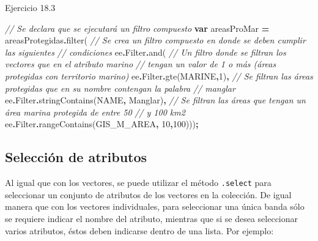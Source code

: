 \documentclass[
  12pt,
  letterpaper,
  twoside]{book}
\newenvironment{Shaded}{\begin{snugshade}}{\end{snugshade}}
\newcommand{\AttributeTok}[1]{\textcolor[rgb]{0.77,0.63,0.00}{#1}}
\newcommand{\CommentTok}[1]{\textcolor[rgb]{0.56,0.35,0.01}{\textit{#1}}}
\newcommand{\DecValTok}[1]{\textcolor[rgb]{0.00,0.00,0.81}{#1}}
\newcommand{\FunctionTok}[1]{\textcolor[rgb]{0.00,0.00,0.00}{#1}}
\newcommand{\KeywordTok}[1]{\textcolor[rgb]{0.13,0.29,0.53}{\textbf{#1}}}
\newcommand{\NormalTok}[1]{#1}
\newcommand{\OperatorTok}[1]{\textcolor[rgb]{0.81,0.36,0.00}{\textbf{#1}}}
\newcommand{\StringTok}[1]{\textcolor[rgb]{0.31,0.60,0.02}{#1}}
\begin{document}
Ejercicio 18.3

\begin{Shaded}
\begin{Highlighting}[]
\CommentTok{// Se declara que se ejecutará un filtro compuesto}
\KeywordTok{var}\NormalTok{ areasProMar }\OperatorTok{=}\NormalTok{ areasProtegidas}\OperatorTok{.}\FunctionTok{filter}\NormalTok{( }
  \CommentTok{// Se crea un filtro compuesto en donde se deben cumplir las siguientes }
  \CommentTok{// condiciones}
\NormalTok{  ee}\OperatorTok{.}\AttributeTok{Filter}\OperatorTok{.}\FunctionTok{and}\NormalTok{(    }
  \CommentTok{// Un filtro donde se filtran los vectores que en el atributo marino }
  \CommentTok{// tengan un valor de 1 o más (áreas protegidas con territorio marino)}
\NormalTok{  ee}\OperatorTok{.}\AttributeTok{Filter}\OperatorTok{.}\FunctionTok{gte}\NormalTok{(}\StringTok{\textquotesingle{}MARINE\textquotesingle{}}\OperatorTok{,}\DecValTok{1}\NormalTok{)}\OperatorTok{,}   
  \CommentTok{// Se filtran las áreas protegidas que en su nombre contengan la palabra}
  \CommentTok{// manglar}
\NormalTok{  ee}\OperatorTok{.}\AttributeTok{Filter}\OperatorTok{.}\FunctionTok{stringContains}\NormalTok{(}\StringTok{\textquotesingle{}NAME\textquotesingle{}}\OperatorTok{,} \StringTok{\textquotesingle{}Manglar\textquotesingle{}}\NormalTok{)}\OperatorTok{,}
  \CommentTok{// Se filtran las áreas que tengan un área marina protegida de entre 50 }
  \CommentTok{// y 100 km2}
\NormalTok{  ee}\OperatorTok{.}\AttributeTok{Filter}\OperatorTok{.}\FunctionTok{rangeContains}\NormalTok{(}\StringTok{\textquotesingle{}GIS\_M\_AREA\textquotesingle{}}\OperatorTok{,} \DecValTok{10}\OperatorTok{,}\DecValTok{100}\NormalTok{)))}\OperatorTok{;} 
\end{Highlighting}
\end{Shaded}

\hypertarget{selecciuxf3n-de-atributos}{%
\subsection{Selección de atributos}\label{selecciuxf3n-de-atributos}}

Al igual que con los vectores, se puede utilizar el método \texttt{.select} para seleccionar un conjunto de atributos de los vectores en la colección. De igual manera que con los vectores individuales, para seleccionar una única banda sólo se requiere indicar el nombre del atributo, mientras que si se desea seleccionar varios atributos, éstos deben indicarse dentro de una lista. Por ejemplo:
\end{document}
